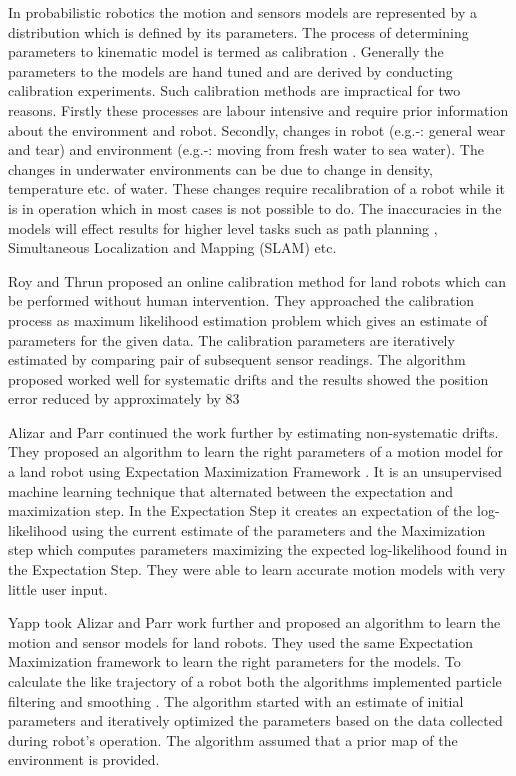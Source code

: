 \documentclass[12pt,draft]{dalcsthesis}
\begin{document}
In probabilistic robotics the motion and sensors models are represented by a distribution which is defined by its parameters.  The process of determining parameters to kinematic model is termed as calibration \cite{cox1990autonomous} \cite{vukobratovic1989introduction}. Generally the parameters to the models are hand tuned and are derived by conducting calibration experiments. Such calibration methods are impractical for two reasons. Firstly these processes are labour intensive and require prior information about the environment and robot. Secondly, changes in robot (e.g.-:  general wear and tear) and environment (e.g.-: moving from fresh water to sea water). The changes in underwater environments can be due to change in density, temperature etc. of water. These changes require recalibration of a robot while it is in operation which in most cases is not possible to do. The inaccuracies in the models will effect results for higher level tasks such as path planning \cite{Lav06}, Simultaneous Localization and 
Mapping (SLAM) \cite{thrun2005probabilistic} \cite{grisettiyz2005improving} etc.

Roy and Thrun \cite{Roy} proposed an online calibration method for land robots which can be performed without human intervention.  They approached the calibration process as maximum likelihood estimation problem which gives an estimate of parameters for the given data. The calibration parameters are iteratively estimated by comparing pair of subsequent sensor readings. The algorithm proposed worked well for systematic drifts and the results showed the position error reduced by approximately by 83%

Alizar and Parr \cite{Eliazar2004} continued the work further by estimating non-systematic drifts.  They proposed an algorithm to learn the right parameters of a motion model for a land robot using Expectation Maximization Framework \cite{dempster1977maximum}. It is an unsupervised machine learning technique that alternated between the expectation and maximization step. In the Expectation Step it creates an expectation of the log-likelihood using the current estimate of the parameters and the Maximization step which computes parameters maximizing the expected log-likelihood found in the Expectation Step. They were able to learn accurate motion models with very little user input.

Yapp \cite{Yap2008} took Alizar and Parr \cite{Eliazar2004} work further and proposed an algorithm to learn the motion and sensor models for land robots. They used the same Expectation Maximization framework to learn the right parameters for the models. To calculate the like trajectory of a robot both the algorithms implemented particle filtering \cite{ristic2004beyond} \cite{chen2003bayesian} and smoothing \cite{doucet2000monte}.  The algorithm started with an estimate of initial parameters and iteratively optimized the parameters based on the data collected during robot’s operation. The algorithm assumed that a prior map of the environment is provided. 
\end{document}
